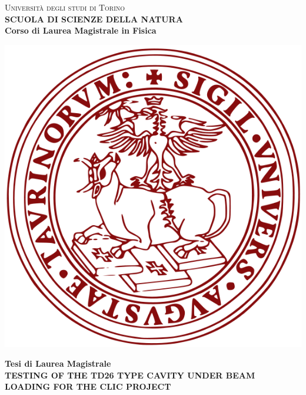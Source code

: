 \begin{titlepage}
\begin{center}
{{\Large{\textsc{Universit\`a degli studi di Torino \\}}}} \vspace{5mm} {\small{\bf SCUOLA DI SCIENZE DELLA NATURA\\ \vspace{3mm}
Corso di Laurea Magistrale in Fisica}}
\vspace{5mm}
\end{center}
\begin{center}
\includegraphics[scale=.3]{head/logo.png}
\end{center}
\begin{center}
\vspace{5mm}
{\large{\bf Tesi di Laurea Magistrale\\}}
\vspace{5mm}
{\LARGE{\bf TESTING OF THE TD26 TYPE CAVITY UNDER BEAM LOADING FOR THE CLIC PROJECT\\}}
\end{center}
\vspace{20mm}
\par
\noindent
\begin{minipage}[t]{0.47\textwidth}

\end{minipage}
\end{titlepage}
